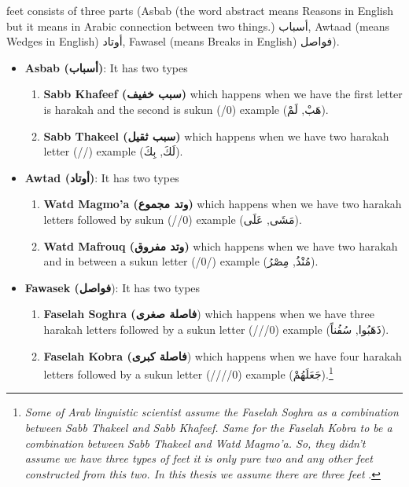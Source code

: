 feet consists of three parts (Asbab (the word abstract means Reasons in English but it means in Arabic connection between two things.) \textarabic{أسباب}, Awtaad (means Wedges in English) \textarabic{أوتاد}, Fawasel (means Breaks in English) \textarabic{فواصل}).
\begin{itemize}
\item \textbf{Asbab (\textarabic{أسباب})}: It has two types
  \begin{enumerate}
  \item \textbf{Sabb Khafeef (\textarabic{سبب خفيف})} which happens when we have the first letter is harakah and the second is sukun (/0) example (\textarabic{هَبْ, لَمْ}).
    \item \textbf{Sabb Thakeel (\textarabic{سبب ثقيل})} which happens when we have two harakah letter (//) example (\textarabic{لَكَ, بِكَ}).
    \end{enumerate}
    \item \textbf{Awtad (\textarabic{أوتاد})}: It has two types
  \begin{enumerate}
  \item \textbf{Watd Magmo'a (\textarabic{وتد مجموع})} which happens when we have two harakah letters followed by sukun (//0) example (\textarabic{مَشَى, عَلَى}).
    \item \textbf{Watd Mafrouq (\textarabic{وتد مفروق})} which happens when we have two harakah and in between a sukun letter (/0/) example (\textarabic{مُنْذُ, مِصْرُ}).
    \end{enumerate}
    \item \textbf{Fawasek (\textarabic{فواصل}}): It has two types
  \begin{enumerate}
  \item \textbf{Faselah Soghra (\textarabic{فاصلة صغرى}}) which happens when we have three harakah letters followed by a sukun letter (///0) example (\textarabic{ذَهَبُوا, سُفُناً}).
    \item \textbf{Faselah Kobra (\textarabic{فاصلة كبرى}}) which happens when we have four harakah letters followed by a sukun letter  (////0) example (\textarabic{جَعَلَهُمْ}).\footnote{\textit{Some of Arab linguistic scientist assume the Faselah Soghra as a combination between Sabb Thakeel and Sabb Khafeef. Same for the Faselah Kobra to be a combination between Sabb Thakeel and Watd Magmo'a. So, they didn't assume we have three types of feet it is only pure two and any other feet constructed from this two. In this thesis we assume there are three feet }.}
    \end{enumerate}
  \end{itemize}


